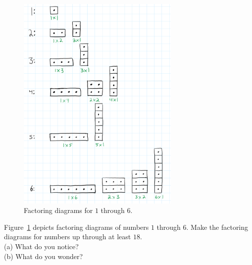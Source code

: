 \begin{figure}[h!]
    \centering
    \includegraphics[width=0.7\textwidth]{img/number_factors.png}  
    \caption{Factoring diagrams for \(1\) through \(6\).}
    \label{fig:number-factors}
\end{figure}
\begin{exercise}
	Figure~\ref{fig:number-factors} depicts factoring diagrams of numbers \(1\) through \(6\).  
	Make the factoring diagrams for numbers up through at least \(18\).  
	\\ \hspace*{15mm}(a) What do you notice?
	\\ \hspace*{15mm}(b) What do you wonder? 
\end{exercise}



